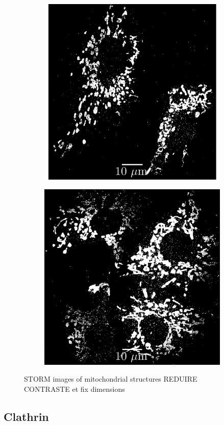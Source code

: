 \begin{figure}
    \begin{subfigure}{0.49\textwidth}
        \includegraphics[width=\textwidth]{figures/mitochondria_image4.png}
        \caption{}
        \label{fig:mitochondria_image4}
    \end{subfigure}
    \begin{subfigure}{0.49\textwidth}
        \includegraphics[width=\textwidth]{figures/mitochondria_image11.png}
        \caption{}
        \label{fig:mitochondria_image11}
    \end{subfigure}
    \caption{STORM images of mitochondrial structures REDUIRE CONTRASTE et fix dimensions}
    \label{fig:mitochondria_images}
\end{figure}


\subsection{Clathrin}
